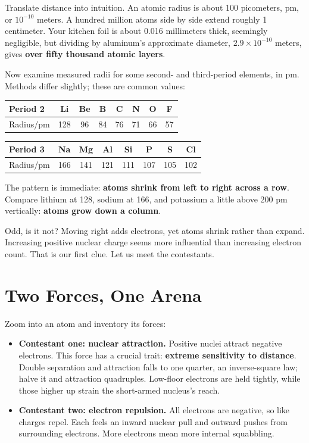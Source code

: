 Translate distance into intuition. An atomic radius is about 100 picometers, pm, or $10^{-10}$ meters. A hundred million atoms side by side extend roughly 1 centimeter. Your kitchen foil is about 0.016 millimeters thick, seemingly negligible, but dividing by aluminum's approximate diameter, $2.9\times 10^{-10}$ meters, gives \textbf{over fifty thousand atomic layers}.

Now examine measured radii for some second- and third-period elements, in pm. Methods differ slightly; these are common values:

\begin{table}[htbp]
\centering
\begin{tabular}{lccccccc}
\toprule
Period 2 & Li & Be & B & C & N & O & F \\
\midrule
Radius/pm & 128 & 96 & 84 & 76 & 71 & 66 & 57 \\
\bottomrule
\end{tabular}
\end{table}

\begin{table}[htbp]
\centering
\begin{tabular}{lccccccc}
\toprule
Period 3 & Na & Mg & Al & Si & P & S & Cl \\
\midrule
Radius/pm & 166 & 141 & 121 & 111 & 107 & 105 & 102 \\
\bottomrule
\end{tabular}
\end{table}

The pattern is immediate: \textbf{atoms shrink from left to right across a row}. Compare lithium at 128, sodium at 166, and potassium a little above 200 pm vertically: \textbf{atoms grow down a column}.

Odd, is it not? Moving right adds electrons, yet atoms shrink rather than expand. Increasing positive nuclear charge seems more influential than increasing electron count. That is our first clue. Let us meet the contestants.

\section{Two Forces, One Arena}

Zoom into an atom and inventory its forces:

\begin{itemize}[itemsep=2pt]
\item \textbf{Contestant one: nuclear attraction.} Positive nuclei attract negative electrons. This force has a crucial trait: \textbf{extreme sensitivity to distance}. Double separation and attraction falls to one quarter, an inverse-square law; halve it and attraction quadruples. Low-floor electrons are held tightly, while those higher up strain the short-armed nucleus's reach.
\item \textbf{Contestant two: electron repulsion.} All electrons are negative, so like charges repel. Each feels an inward nuclear pull and outward pushes from surrounding electrons. More electrons mean more internal squabbling.
\end{itemize}

